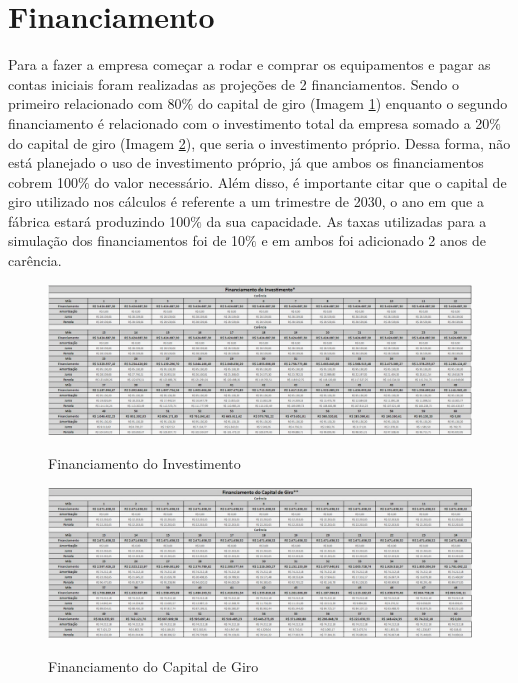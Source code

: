 \documentclass[
	12pt,				%
	openright,			%
	oneside,			%
	a4paper,			%
	english,			%
	french,				%
	spanish,			%
	brazil				%
	]{abntex2}
\begin{document}
\section{Financiamento}

Para a fazer a empresa começar a rodar e comprar os equipamentos e pagar as contas iniciais foram realizadas as projeções de 2 financiamentos. Sendo o primeiro relacionado com 80$\%$ do capital de giro (Imagem \ref{fin1}) enquanto o segundo financiamento é relacionado com o investimento total da empresa somado a 20$\%$ do capital de giro (Imagem \ref{fin2}), que seria o investimento próprio. Dessa forma, não está planejado o uso de investimento próprio, já que ambos os financiamentos cobrem 100$\%$ do valor necessário. Além disso, é importante citar que o capital de giro utilizado nos cálculos é referente a um trimestre de 2030, o ano em que a fábrica estará produzindo 100$\%$ da sua capacidade. As taxas utilizadas para a simulação dos financiamentos foi de 10$\%$ e em ambos foi adicionado 2 anos de carência.

\begin{landscape}

\begin{figure}[]
\begin{center}
\caption{Financiamento do Investimento}
\includegraphics[scale=0.5]{a3.jpeg} 
\label{fin1}
\end{center}
\end{figure}

\end{landscape}

\begin{landscape}

\begin{figure}[]
\begin{center}
\caption{Financiamento do Capital de Giro}
\includegraphics[scale=0.5]{a4.jpeg} 
\label{fin2}
\end{center}
\end{figure}

\end{landscape}
\end{document}
